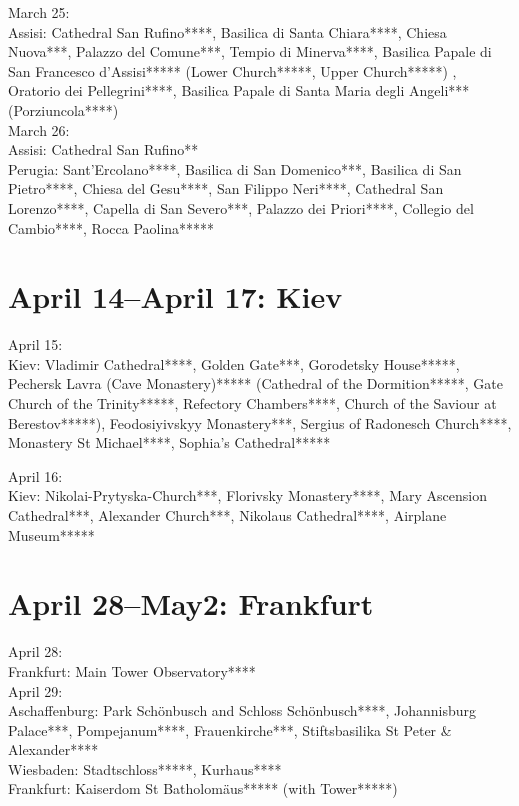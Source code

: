March 25:\\
Assisi: Cathedral San Rufino****, Basilica di Santa Chiara****, Chiesa Nuova***, Palazzo del Comune***, Tempio di Minerva****, Basilica Papale di San Francesco d'Assisi***** (Lower Church*****, Upper Church*****) , Oratorio dei Pellegrini****, Basilica Papale di Santa Maria degli Angeli*** (Porziuncola****)\\

March 26:\\
Assisi: Cathedral San Rufino**\\
Perugia: Sant'Ercolano****, Basilica di San Domenico***, Basilica di San Pietro****, Chiesa del Gesu****, San Filippo Neri****, Cathedral San Lorenzo****, Capella di San Severo***, Palazzo dei Priori****, Collegio del Cambio****, Rocca Paolina*****

\section{April 14--April 17: Kiev}
\label{Kiev2017}

April 15:\\
Kiev: Vladimir Cathedral****, Golden Gate***, Gorodetsky House*****, Pechersk Lavra (Cave Monastery)***** (Cathedral of the Dormition*****, Gate Church of the Trinity*****, Refectory Chambers****, Church of the Saviour at Berestov*****), Feodosiyivskyy Monastery***, Sergius of Radonesch Church****, Monastery St Michael****, Sophia's Cathedral*****

April 16:\\
Kiev: Nikolai-Prytyska-Church***, Florivsky Monastery****, Mary Ascension Cathedral***, Alexander Church***, Nikolaus Cathedral****, Airplane Museum*****

\section{April 28--May2: Frankfurt}
\label{Frankfurt2017}

April 28:\\
Frankfurt: Main Tower Observatory****\\

April 29:\\
Aschaffenburg: Park Sch\"onbusch and Schloss Sch\"onbusch****, Johannisburg Palace***, Pompejanum****, Frauenkirche***, Stiftsbasilika St Peter \& Alexander****\\
Wiesbaden: Stadtschloss*****, Kurhaus****\\
Frankfurt: Kaiserdom St Batholom\"aus***** (with Tower*****)\\


